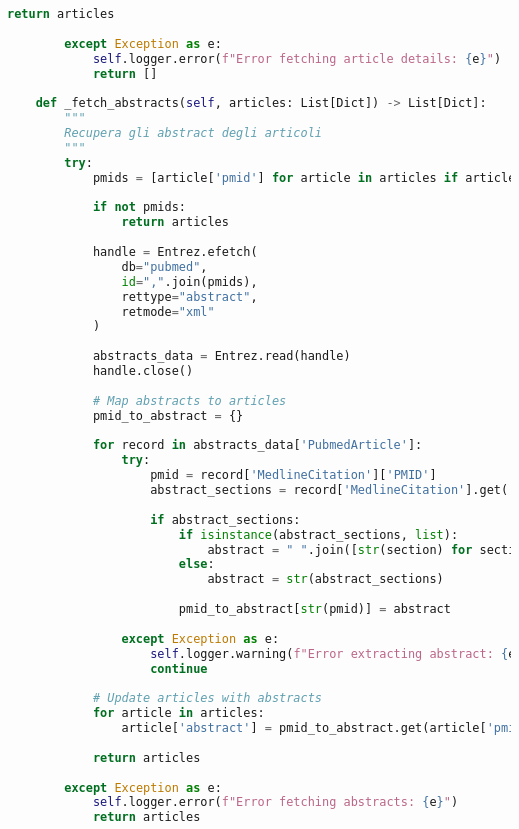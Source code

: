 \documentclass[12pt,a4paper]{report}
\begin{document}
\begin{lstlisting}[language=Python, caption=PubMed Service Implementation]
            return articles
            
        except Exception as e:
            self.logger.error(f"Error fetching article details: {e}")
            return []
    
    def _fetch_abstracts(self, articles: List[Dict]) -> List[Dict]:
        """
        Recupera gli abstract degli articoli
        """
        try:
            pmids = [article['pmid'] for article in articles if article['pmid']]
            
            if not pmids:
                return articles
            
            handle = Entrez.efetch(
                db="pubmed",
                id=",".join(pmids),
                rettype="abstract",
                retmode="xml"
            )
            
            abstracts_data = Entrez.read(handle)
            handle.close()
            
            # Map abstracts to articles
            pmid_to_abstract = {}
            
            for record in abstracts_data['PubmedArticle']:
                try:
                    pmid = record['MedlineCitation']['PMID']
                    abstract_sections = record['MedlineCitation'].get('Article', {}).get('Abstract', {}).get('AbstractText', [])
                    
                    if abstract_sections:
                        if isinstance(abstract_sections, list):
                            abstract = " ".join([str(section) for section in abstract_sections])
                        else:
                            abstract = str(abstract_sections)
                        
                        pmid_to_abstract[str(pmid)] = abstract
                        
                except Exception as e:
                    self.logger.warning(f"Error extracting abstract: {e}")
                    continue
            
            # Update articles with abstracts
            for article in articles:
                article['abstract'] = pmid_to_abstract.get(article['pmid'], '')
            
            return articles
            
        except Exception as e:
            self.logger.error(f"Error fetching abstracts: {e}")
            return articles
    

\end{lstlisting}
\end{document}

